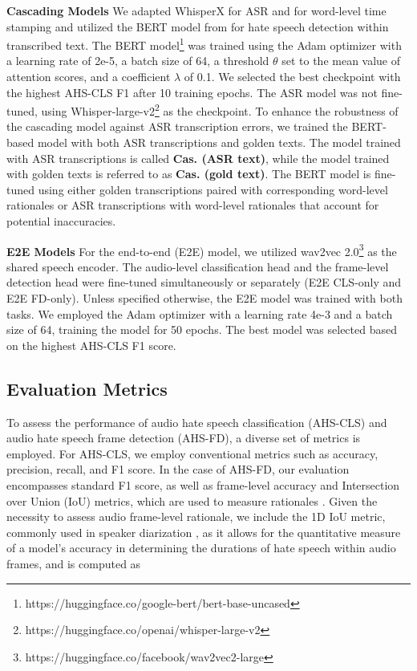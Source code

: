 \documentclass[11pt]{article}
\begin{document}
\textbf{Cascading Models} We adapted WhisperX \cite{whisperX} for ASR and for word-level time stamping and utilized the BERT model from \cite{HateXplain} for hate speech detection within transcribed text. The BERT model\footnote{https://huggingface.co/google-bert/bert-base-uncased} was trained using the Adam optimizer \cite{adam} with a learning rate of 2e-5, a batch size of 64, a threshold $\theta$ set to the mean value of attention scores, and a coefficient $\lambda$ of 0.1. We selected the best checkpoint with the highest AHS-CLS F1 after 10 training epochs. The ASR model was not fine-tuned, using Whisper-large-v2\footnote{https://huggingface.co/openai/whisper-large-v2} as the checkpoint.
To enhance the robustness of the cascading model against ASR transcription errors, we trained the BERT-based model with both ASR transcriptions and golden texts. The model trained with ASR transcriptions is called \textbf{Cas. (ASR text)}, while the model trained with golden texts is referred to as \textbf{Cas. (gold text)}. The BERT model is fine-tuned using either golden transcriptions paired with corresponding word-level rationales or ASR transcriptions with word-level rationales that account for potential inaccuracies.

\noindent\textbf{E2E Models} For the end-to-end (E2E) model, we utilized wav2vec 2.0\footnote{https://huggingface.co/facebook/wav2vec2-large} as the shared speech encoder. The audio-level classification head and the frame-level detection head were fine-tuned simultaneously or separately (E2E CLS-only and E2E FD-only). Unless specified otherwise, the E2E model was trained with both tasks. We employed the Adam optimizer with a learning rate 4e-3 and a batch size of 64, training the model for 50 epochs. The best model was selected based on the highest AHS-CLS F1 score.









\subsection{Evaluation Metrics}
\label{sec:eval}

To assess the performance of audio hate speech classification (AHS-CLS) and audio hate speech frame detection (AHS-FD), a diverse set of metrics is employed. For AHS-CLS, we employ conventional metrics such as accuracy, precision, recall, and F1 score. In the case of AHS-FD, our evaluation encompasses standard F1 score, as well as frame-level accuracy and Intersection over Union (IoU) metrics, which are used to measure rationales \cite{rationale_iou}. Given the necessity to assess audio frame-level rationale, we include the 1D IoU metric, commonly used in speaker diarization \cite{sd}, as it allows for the quantitative measure of a model's accuracy in determining the durations of hate speech within audio frames, and is computed as
\end{document}
